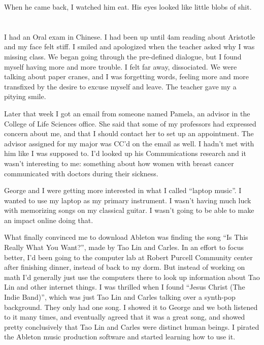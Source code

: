 When he came back, I watched him eat.  His eyes looked like little blobs of
shit.

\section{}

\section{}


\section{}

I had an Oral exam in Chinese.  I had been up until 4am reading about Aristotle
and my face felt stiff.  I smiled and apologized when the teacher asked why I
was missing class.  We began going through the pre-defined dialogue, but I
found myself having more and more trouble.  I felt far away, dissociated.  We
were talking about paper cranes, and I was forgetting words, feeling more and
more transfixed by the desire to excuse myself and leave.  The teacher gave my
a pitying smile.  

Later that week I got an email from someone named Pamela, an advisor in the
College of Life Sciences office.  She said that some of my professors had
expressed concern about me, and that I should contact her to set up an
appointment.  The advisor assigned for my major was CC'd on the email as well.
I hadn't met with him like I was supposed to.  I'd looked up his Communications
research and it wasn't interesting to me: something about how women with breast
cancer communicated with doctors during their sickness.

George and I were getting more interested in what I called ``laptop music''.  I
wanted to use my laptop as my primary instrument.  I wasn't having much luck
with memorizing songs on my classical guitar.  I wasn't going to be able to make
an impact online doing that.  

What finally convinced me to download Ableton was finding the song ``Is This
Really What You Want?'', made by Tao Lin and Carles.  In an effort to focus
better, I'd been going to the computer lab at Robert Purcell Community center
after finishing dinner, instead of back to my dorm.  But instead of working on
math I'd generally just use the computers there to look up information about Tao
Lin and other internet things.  I was thrilled when I found ``Jesus Christ (The
Indie Band)'', which was just Tao Lin and Carles talking over a synth-pop
background.  They only had one song.  I showed it to George and we both listened
to it many times, and eventually agreed that it was a great song, and showed
pretty conclusively that Tao Lin and Carles were distinct human beings.  I
pirated the Ableton music production software and started learning how to use
it.  


